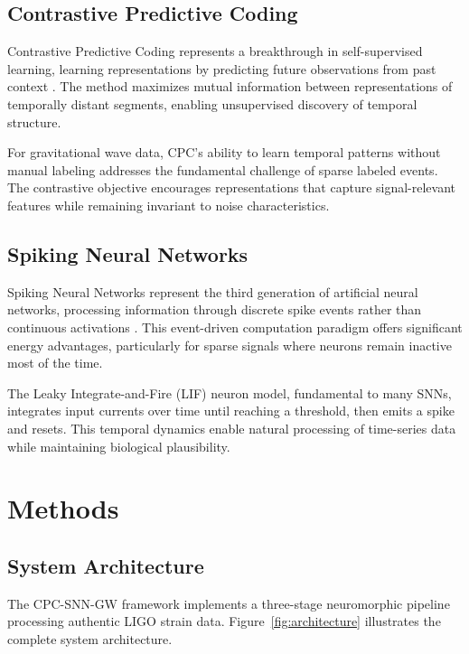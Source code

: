 \documentclass[12pt,a4paper]{article}
\begin{document}
\subsection{Contrastive Predictive Coding}

Contrastive Predictive Coding represents a breakthrough in self-supervised learning, learning representations by predicting future observations from past context \cite{oord2018representation}. The method maximizes mutual information between representations of temporally distant segments, enabling unsupervised discovery of temporal structure.

For gravitational wave data, CPC's ability to learn temporal patterns without manual labeling addresses the fundamental challenge of sparse labeled events. The contrastive objective encourages representations that capture signal-relevant features while remaining invariant to noise characteristics.

\subsection{Spiking Neural Networks}

Spiking Neural Networks represent the third generation of artificial neural networks, processing information through discrete spike events rather than continuous activations \cite{maass1997networks}. This event-driven computation paradigm offers significant energy advantages, particularly for sparse signals where neurons remain inactive most of the time.

The Leaky Integrate-and-Fire (LIF) neuron model, fundamental to many SNNs, integrates input currents over time until reaching a threshold, then emits a spike and resets. This temporal dynamics enable natural processing of time-series data while maintaining biological plausibility.

\section{Methods}

\subsection{System Architecture}

The CPC-SNN-GW framework implements a three-stage neuromorphic pipeline processing authentic LIGO strain data. Figure~\ref{fig:architecture} illustrates the complete system architecture.
\end{document}
